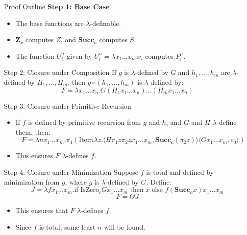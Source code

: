 \documentclass{beamer}
\begin{document}
\begin{frame}{Proof Outline}
  \textbf{Step 1: Base Case}
  \begin{itemize}
      \item The base functions are $\lambda$-definable.
      \item $\mathbf{Z_c}$ computes $Z$, and $\mathbf{Succ_c}$ computes $S$.
      \item The function $U_i^n$ given by $U_i^n = \lambda x_1 \dots x_n. x_i$ computes $P_i^n$.
  \end{itemize}
\end{frame}

\begin{frame}{Step 2: Closure under Composition}
  If $g$ is $\lambda$-defined by $G$ and $h_1, \dots, h_m$ are $\lambda$-defined by $H_1, \dots, H_m$, then $g \circ (h_1, \dots, h_m)$ is $\lambda$-defined by:
  \[
  F = \lambda x_1 \dots x_n. G(H_1 x_1 \dots x_n) \dots (H_m x_1 \dots x_n)
  \]
\end{frame}

\begin{frame}{Step 3: Closure under Primitive Recursion}
  \begin{itemize}
      \item If $f$ is defined by primitive recursion from $g$ and $h$, and $G$ and $H$ $\lambda$-define them, then:
      \[
      F = \lambda n x_1 \dots x_m. \pi_1 (\text{Iter} n \lambda z. \langle H \pi_1 z \pi_2 z x_1 \dots x_m, \mathbf{Succ_c}(\pi_2 z) \rangle \langle G x_1 \dots x_m, c_0 \rangle)
      \]
      \item This ensures $F$ $\lambda$-defines $f$.
  \end{itemize}
\end{frame}

\begin{frame}{Step 4: Closure under Minimization}
  Suppose $f$ is total and defined by minimization from $g$, where $g$ is $\lambda$-defined by $G$. Define:
  \[
  J = \lambda f x_1 \dots x_m. \text{if } \text{IsZero}_c G x_1 \dots x_m \text{ then } x \text{ else } f(\mathbf{Succ_c} x) x_1 \dots x_m
  \]
  \[
  F = \Theta J
  \]
  \begin{itemize}
      \item This ensures that $F$ $\lambda$-defines $f$.
      \item Since $f$ is total, some least $n$ will be found.
  \end{itemize}
\end{frame}
\end{document}
